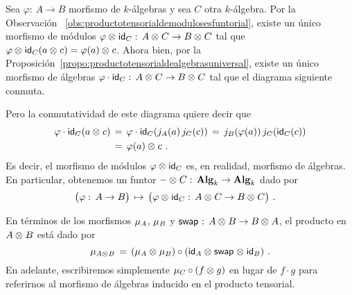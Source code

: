 \begin{obsProductoTensorialDeAlgebras}%
	\label{obs:productotensorialdealgebrasesfuntorial}
	Sea $\varphi:\,A\rightarrow B$ morfismo de $k$-\'{a}lgebras y sea $C$
	otra $k$-\'{a}lgebra. Por la Observaci\'{o}n~%
	\ref{obs:productotensorialdemodulosesfuntorial}, existe un \'{u}nico
	morfismo de m\'{o}dulos
	$\varphi\tensor\id[C]:\,A\tensor C\rightarrow B\tensor C$ tal que
	$\varphi\tensor\id[C](a\tensor c)=\varphi(a)\tensor c$. Ahora bien, por
	la Proposici\'{o}n~\ref{propo:productotensorialdealgebrasuniversal},
	existe un \'{u}nico morfismo de \'{a}lgebras
	$\varphi\cdot\id[C]:\,A\tensor C\rightarrow B\tensor C$ tal que el
	diagrama siguiente conmuta.
	\begin{center}
	\end{center}
	Pero la conmutatividad de este diagrama quiere decir que
	\begin{align*}
		\varphi\cdot\id[C](a\tensor c) & \,=\,
			\varphi\cdot\id[C](j_A(a)\,j_C(c)) \,=\,
			j_B(\varphi(a))\,j_C(\id[C](c)) \\
		& \,=\, \varphi(a)\tensor c
		\text{ .}
	\end{align*}
	Es decir, el morfismo de m\'{o}dulos $\varphi\tensor\id[C]$ es, en
	realidad, morfismo de \'{a}lgebras. En particular, obtenemos un
	funtor $-\tensor C:\,\Alg[k]\rightarrow\Alg[k]$ dado por
	\begin{align*}
		\big(\varphi:\,A\rightarrow B\big) & \,\mapsto\,
			\big(\varphi\tensor\id[C]:\,
				A\tensor C\rightarrow B\tensor C\big)
		\text{ .}
	\end{align*}
\end{obsProductoTensorialDeAlgebras}

\begin{obsProductoTensorialDeAlgebras}\label{obs:productotensorialdealgebras}
	En t\'{e}rminos de los morfismos $\producto[A]$, $\producto[B]$ y
	$\swap:\,A\tensor B\rightarrow B\tensor A$, el producto en $A\tensor B$
	est\'{a} dado por
	\begin{equation}
		\label{eq:productotensorialdealgebras}
		\producto[A\tensor B] \,=\,
			(\producto[A]\tensor\producto[B])\circ
			(\id[A]\tensor\swap\tensor\id[B])
		\text{ .}
	\end{equation}
	En adelante, escribiremos simplemente $\producto[C]\circ (f\tensor g)$
	en lugar de $f\cdot g$ para referirnos al morfismo de \'{a}lgebras
	inducido en el producto tensorial.
\end{obsProductoTensorialDeAlgebras}


